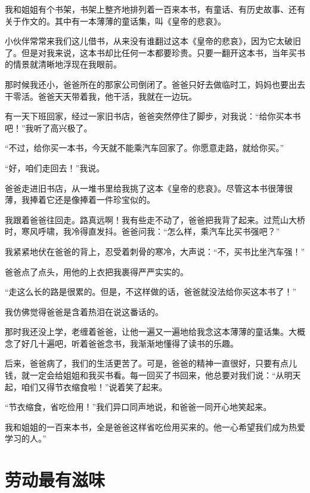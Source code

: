 \documentclass[12pt,UTF-8,openany]{ctexbook}
\begin{document}
\begin{large}
    
    我和姐姐有个书架，书架上整齐地排列着一百来本书，有童话、有历史故事、还有关于作文的。其中有一本薄薄的童话集，叫《皇帝的悲哀》。
    
    小伙伴常常来我们这儿借书，从来没有谁翻过这本《皇帝的悲哀》，因为它太破旧了。但是对我来说，这本书却比任何一本都要珍贵。只要一翻开这本书，当年买书的情景就清晰地浮现在我眼前。
    
    那时候我还小，爸爸所在的那家公司倒闭了。爸爸只好去做临时工，妈妈也要出去干零活。爸爸天天带着我，他干活，我就在一边玩。
    
    有一天下班回家，经过一家旧书店，爸爸突然停住了脚步，对我说：“给你买本书吧！”我听了高兴极了。
    
    “不过，给你买一本书，今天就不能乘汽车回家了。你愿意走路，就给你买。”
    
    “好，咱们走回去！”我说。
    
    爸爸走进旧书店，从一堆书里给我挑了这本《皇帝的悲哀》。尽管这本书很薄很薄，我捧着它还是像捧着一件珍宝似的。
    
    我跟着爸爸往回走。路真远啊！我有些走不动了，爸爸把我背了起来。过荒山大桥时，寒风呼啸，我冷得直发抖。爸爸问我：“怎么样，乘汽车比买书强吧？”
    
    我紧紧地伏在爸爸的背上，忍受着刺骨的寒冷，大声说：“不，买书比坐汽车强！”
    
    爸爸点了点头，用他的上衣把我裹得严严实实的。
    
    “走这么长的路是很累的。但是，不这样做的话，爸爸就没法给你买这本书了！”
    
    我仿佛觉得爸爸是含着热泪在说这番话的。
    
    那时我还没上学，老缠着爸爸，让他一遍又一遍地给我念这本薄薄的童话集。大概念了好几十遍吧，听着爸爸念书，我渐渐地懂得了读书的乐趣。
    
    后来，爸爸病了，我们的生活更苦了。可是，爸爸的精神一直很好，只要有点儿钱，就一定会给姐姐和我买书看。每一回买了书回来，他总要对我们说：“从明天起，咱们又得节衣缩食啦！”说着笑了起来。
    
    “节衣缩食，省吃俭用！”我们异口同声地说，和爸爸一同开心地笑起来。
    
    我和姐姐的一百来本书，全是爸爸这样省吃俭用买来的。他一心希望我们成为热爱学习的人。”
    
\end{large}



\chapter{劳动最有滋味}
\end{document}
